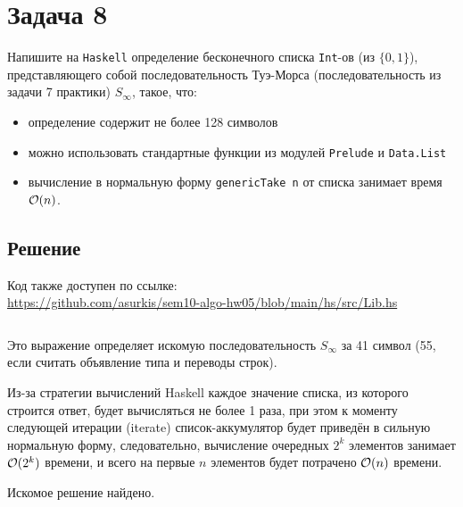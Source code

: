 \section{Задача 8}
Напишите на \texttt{Haskell} определение бесконечного списка
\texttt{Int}-ов (из $\{ 0, 1 \}$), представляющего собой последовательность
Туэ-Морса (последовательность из задачи 7 практики) $S_\infty$, такое, что:
\begin{itemize}
\item определение содержит не более 128 символов
\item можно использовать стандартные функции из модулей \texttt{Prelude} и \texttt{Data.List}
\item вычисление в нормальную форму \texttt{genericTake n} от списка занимает время $\mathcal{O}(n)$.
\end{itemize}

\subsection{Решение}
Код также доступен по ссылке:\\
\url{https://github.com/asurkis/sem10-algo-hw05/blob/main/hs/src/Lib.hs}

\inputminted[firstline=3]{Haskell}{hs/src/Lib.hs}

Это выражение определяет искомую последовательность $S_\infty$ за 41 символ
(55, если считать объявление типа и переводы строк).

Из-за стратегии вычислений Haskell каждое значение списка, из которого строится ответ,
будет вычисляться не более 1 раза, при этом к моменту следующей итерации (iterate)
список-аккумулятор будет приведён в сильную нормальную форму,
следовательно, вычисление очередных $2^k$ элементов занимает $\mathcal{O}(2^k)$ времени,
и всего на первые $n$ элементов будет потрачено $\mathcal{O}(n)$ времени.

Искомое решение найдено.
